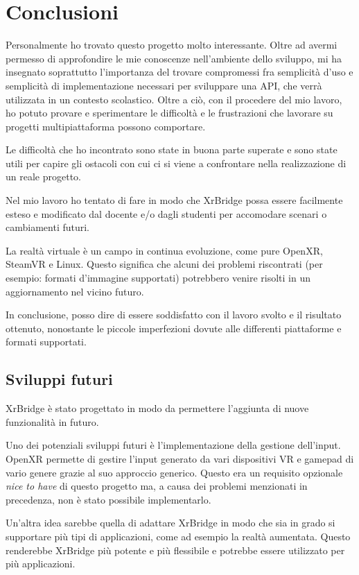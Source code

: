 \documentclass[twoside]{supsistudent}
\begin{document}
\chapter{Conclusioni}

Personalmente ho trovato questo progetto molto interessante. Oltre ad avermi permesso di approfondire le mie conoscenze nell'ambiente dello sviluppo, mi ha insegnato soprattutto l'importanza del trovare compromessi fra semplicità d'uso e semplicità di implementazione necessari per sviluppare una API, che verrà utilizzata in un contesto scolastico. Oltre a ciò, con il procedere del mio lavoro, ho potuto provare e sperimentare le difficoltà e le frustrazioni che lavorare su progetti multipiattaforma possono comportare.

Le difficoltà che ho incontrato sono state in buona parte superate e sono state utili per capire gli ostacoli con cui ci si viene a confrontare nella realizzazione di un reale progetto.

Nel mio lavoro ho tentato di fare in modo che XrBridge possa essere facilmente esteso e modificato dal docente e/o dagli studenti per accomodare scenari o cambiamenti futuri.

La realtà virtuale è un campo in continua evoluzione, come pure OpenXR, SteamVR e Linux. Questo significa che alcuni dei problemi riscontrati (per esempio: formati d'immagine supportati) potrebbero venire risolti in un aggiornamento nel vicino futuro.

In conclusione, posso dire di essere soddisfatto con il lavoro svolto e il risultato ottenuto, nonostante le piccole imperfezioni dovute alle differenti piattaforme e formati supportati.

\section{Sviluppi futuri}

XrBridge è stato progettato in modo da permettere l'aggiunta di nuove funzionalità in futuro.

Uno dei potenziali sviluppi futuri è l'implementazione della gestione dell'input. OpenXR permette di gestire l'input generato da vari dispositivi VR e gamepad di vario genere grazie al suo approccio generico. Questo era un requisito opzionale \textit{nice to have} di questo progetto ma, a causa dei problemi menzionati in precedenza, non è stato possibile implementarlo.

Un'altra idea sarebbe quella di adattare XrBridge in modo che sia in grado si supportare più tipi di applicazioni, come ad esempio la realtà aumentata. Questo renderebbe XrBridge più potente e più flessibile e potrebbe essere utilizzato per più applicazioni.
\end{document}
